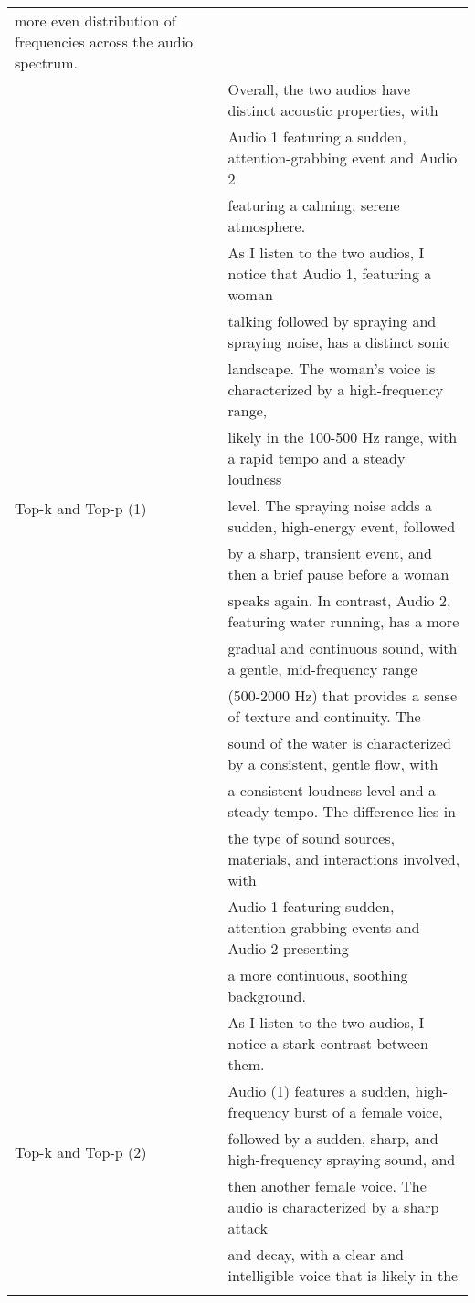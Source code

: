 \begin{table}
{\begin{tabular}{ll}
more even distribution of frequencies across the audio spectrum. \\&
Overall, the two audios have distinct acoustic properties, with \\&
Audio 1 featuring a sudden, attention-grabbing event and Audio 2 \\&
featuring a calming, serene atmosphere. \\
\midrule
\multirow{10}{*}{Top-k and Top-p  (1)} & As I listen to the two audios, I notice that Audio 1, featuring a woman \\&
talking followed by spraying and spraying noise, has a distinct sonic \\&
landscape. The woman's voice is characterized by a high-frequency range, \\&
likely in the 100-500 Hz range, with a rapid tempo and a steady loudness \\&
level. The spraying noise adds a sudden, high-energy event, followed \\&
by a sharp, transient event, and then a brief pause before a woman \\&
speaks again. In contrast, Audio 2, featuring water running, has a more \\&
gradual and continuous sound, with a gentle, mid-frequency range \\&
(500-2000 Hz) that provides a sense of texture and continuity. The \\&
sound of the water is characterized by a consistent, gentle flow, with \\&
a consistent loudness level and a steady tempo. The difference lies in \\&
the type of sound sources, materials, and interactions involved, with \\&
Audio 1 featuring sudden, attention-grabbing events and Audio 2 presenting \\&
a more continuous, soothing background. \\
\midrule
\multirow{10}{*}{Top-k and Top-p (2)} & As I listen to the two audios, I notice a stark contrast between them. \\&
Audio (1) features a sudden, high-frequency burst of a female voice, \\&
followed by a sudden, sharp, and high-frequency spraying sound, and \\&
then another female voice. The audio is characterized by a sharp attack \\&
and decay, with a clear and intelligible voice that is likely in the \\&

\end{tabular}}
\end{table}
